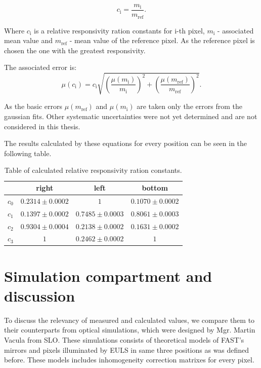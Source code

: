 \begin{equation}
c_{\textrm{i}} = \frac{m_{\textrm{i}}}{m_{\textrm{ref}}}.
\end{equation}

Where $c_{\textrm{i}}$ is a relative responsivity ration constants for i-th pixel, $m_{\textrm{i}}$ - associated mean value and $m_{\textrm{ref}}$ - mean value of the reference pixel. As the reference pixel is chosen the one with the greatest responsivity. 
\par
The associated error is:
\begin{equation}
\mu(c_{\textrm{i}}) = c_{\textrm{i}} \sqrt{(\frac{\mu(m_{\textrm{i}})}{m_{\textrm{i}}})^2 + (\frac{\mu(m_{\textrm{ref}})}{m_{\textrm{ref}}})^2}.
\end{equation}

As the basic errors $\mu(m_{\textrm{ref}})$ and $\mu(m_{\textrm{i}})$ are taken only the errors from the gaussian fits. Other systematic uncertainties were not yet determined and are not considered in this thesis.
\par
The results calculated by these equations for every position can be seen in the following table.

\begin{table}[H]
\centering
\begin{tabular}{|c|c|c|c|}
\hline
   & right & left & bottom \\ \hline
$c_0$ & $0.2314 \pm 0.0002$    & $1$   				   & $0.1070 \pm 0.0002$     \\ \hline
$c_1$ & $0.1397 \pm 0.0002$    & $0.7485 \pm 0.0003$   & $0.8061 \pm 0.0003$      \\ \hline
$c_2$ & $0.9304 \pm 0.0004$    & $0.2138 \pm 0.0002$   & $0.1631 \pm 0.0002$      \\ \hline
$c_3$ & $1$    				   & $0.2462 \pm 0.0002$   & $1$      \\ \hline
\end{tabular}
\caption{Table of calculated relative responsivity ration constants.}
 \label{CalibConstTbl}
\end{table}



\section{Simulation compartment and discussion}

To discuss the relevancy of measured and calculated values, we compare them to their counterparts from optical simulations, which were designed by Mgr. Martin Vacula from SLO. These simulations consists of theoretical models of FAST's mirrors and pixels illuminated by EULS in same three positions as was defined before. These models includes inhomogeneity correction matrixes for every pixel.

